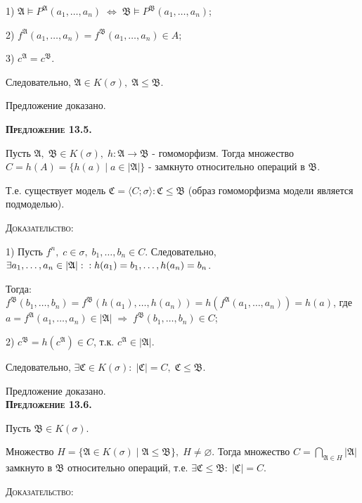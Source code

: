\documentclass[18pt, a4paper]{extarticle}
\begin{document}
1) $\mathfrak{A}\vDash P^{\mathfrak{A}}(a_1,\dots,a_n)\;\Leftrightarrow\;\mathfrak{B}\vDash P^{\mathfrak{B}}(a_1,\dots,a_n)$;

2) $f^{\mathfrak{A}}(a_1,\dots,a_n)=f^{\mathfrak{B}}(a_1,\dots,a_n)\in A$;

3) $c^{\mathfrak{A}}=c^{\mathfrak{B}}$.

Следовательно, $\mathfrak{A}\in K(\sigma),\;\mathfrak{A}\leqslant\mathfrak{B}$.

Предложение доказано.\\

\newpage

\textbf{\textsc{Предложение 13.5.}} 

Пусть $\mathfrak{A},\;\mathfrak{B}\in K(\sigma),\;h:\mathfrak{A}\to\mathfrak{B}$ -  гомоморфизм. Тогда множество $C=h(A)=\{h(a)\;|\;a\in|\mathfrak{A}|\}$ -  замкнуто относительно операций в $\mathfrak{B}$. 

Т.е. существует модель $\mathfrak{C}=\langle C;\sigma\rangle :\mathfrak{C}\leqslant\mathfrak{B}$ (образ гомоморфизма модели является подмоделью).

\textsc{Доказательство:}

1) Пусть $f^n,\;c\in\sigma,\;b_1,\dots,b_n\in C$. Следовательно, $\exists a_1,\dots,a_n\in|\mathfrak{A}|:\newline:h(a_1)=b_1,\dots,h(a_n)=b_n$.

Тогда: $f^{\mathfrak{B}}(b_1,\dots,b_n)=f^{\mathfrak{B}}(h(a_1),\dots,h(a_n))=h(f^{\mathfrak{A}}(a_1,\dots,a_n))=h(a)$, где $a=f^{\mathfrak{A}}(a_1,\dots,a_n)\in|\mathfrak{A}|\;\Rightarrow\;f^{\mathfrak{B}}(b_1,\dots,b_n)\in C$;

2) $c^{\mathfrak{B}}=h(c^{\mathfrak{A}})\in C$, т.к. $c^{\mathfrak{A}}\in|\mathfrak{A}|$.

Следовательно, $\exists\mathfrak{C}\in K(\sigma):\;|\mathfrak{C}|=C,\;\mathfrak{C}\leqslant\mathfrak{B}$.

Предложение доказано.\\

\textbf{\textsc{Предложение 13.6.}} 

Пусть $\mathfrak{B}\in K(\sigma)$. 

Множество $H=\{\mathfrak{A}\in K(\sigma)\;|\;\mathfrak{A}\leqslant\mathfrak{B}\},\; H\neq\varnothing$. Тогда множество $C=\underset{\mathfrak{A}\in H}{\bigcap}|\mathfrak{A}|$ замкнуто в $\mathfrak{B}$ относительно операций, т.е. $\exists\mathfrak{C}\leqslant\mathfrak{B}:\;|\mathfrak{C}|=C$.

\textsc{Доказательство:}
\end{document}
